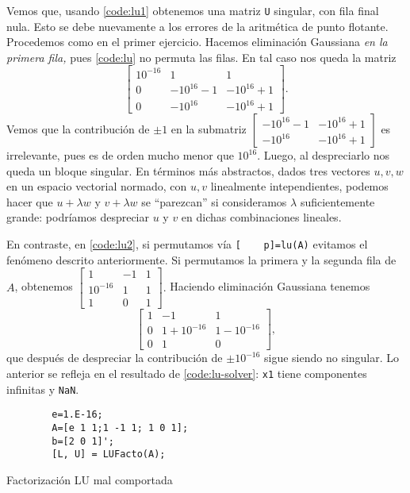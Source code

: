 Vemos que, usando \eqref{code:lu1} obtenemos una matriz \texttt{U} singular, con fila final nula. Esto se debe nuevamente a los errores de la aritm\'etica de punto flotante. Procedemos como en el primer ejercicio. Hacemos eliminaci\'on Gaussiana \emph{en la primera fila,} pues \eqref{code:lu} no permuta las filas. En tal caso nos queda la matriz
\[
    \begin{bmatrix}
        10^{-16} & 1 & 1\\ 0 & -10^{16} - 1 & -10^{16} +1\\0 & -10^{16} & -10^{16} +1
    \end{bmatrix}.
\]
Vemos que la contribuci\'on de \(\pm 1\) en la submatriz \(\begin{bmatrix}  -10^{16} - 1 & -10^{16} +1\\ -10^{16} & -10^{16} +1 \end{bmatrix} \) es irrelevante, pues es de orden mucho menor que \(10^{16}\). Luego, al despreciarlo nos queda un bloque singular. En t\'erminos m\'as abstractos, dados tres vectores \(u,v,w\) en un espacio vectorial normado, con \(u,v\) linealmente intependientes, podemos hacer que \(u+\lambda w\) y \(v + \lambda w\) se ``parezcan'' si consideramos \(\lambda\) suficientemente grande: podr\'iamos despreciar \(u\) y \(v\) en dichas combinaciones lineales.

En contraste, en \eqref{code:lu2}, si permutamos v\'ia \texttt{[~ ~ p]=lu(A)} evitamos el fen\'omeno descrito anteriormente. Si permutamos la primera y la segunda fila de \(A\), obtenemos \(\begin{bmatrix}
    1 & - 1 & 1\\10^{-16} & 1 & 1\\  1 & 0 &  1
\end{bmatrix}.\) Haciendo eliminaci\'on Gaussiana tenemos
\[
    \begin{bmatrix}
        1 & - 1 & 1\\0 & 1 + 10^{-16} & 1 -10^{-16}\\  0 & 1 &  0
    \end{bmatrix},
\] que despu\'es de despreciar la contribuci\'on de \(\pm 10^{-16}\) sigue siendo no singular. Lo anterior se refleja en el resultado de \eqref{code:lu-solver}: \texttt{x1} tiene componentes infinitas y \texttt{NaN}.

\begin{listing}[hb!]
    \begin{verbatim}
        e=1.E-16;
        A=[e 1 1;1 -1 1; 1 0 1];
        b=[2 0 1]';
        [L, U] = LUFacto(A);
    \end{verbatim}
    \caption{Factorizaci\'on LU mal comportada}
    \label{code:lu1}
\end{listing}


